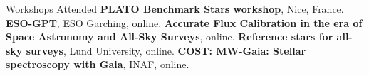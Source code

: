 \begin{rubric}{Workshops Attended}
\entry*[2025]
    \textbf{PLATO Benchmark Stars workshop}, Nice, France.
\entry*[2024]
    \textbf{ESO-GPT}, ESO Garching, online.
\entry*[2024]
    \textbf{Accurate Flux Calibration in the era of Space Astronomy and All-Sky Surveys}, online.
\entry*[2021]
    \textbf{Reference stars for all-sky surveys}, Lund University, online.
\entry*[2021]
    \textbf{COST: MW-Gaia: Stellar spectroscopy with Gaia}, INAF, online.

\end{rubric}